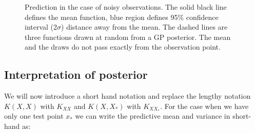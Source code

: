\begin{figure}[!ht]
  \centering
    \quad
{}\quad
  
       \caption{Prediction in the case of noisy observations. The solid black line defines the mean function, blue region defines 95\% confidence interval (2\(\sigma\)) distance away from the mean. The dashed lines are three functions drawn at random from a GP posterior. The mean and the draws do not pass exactly from the observation point.}
       \label{figGPNoisyPosteriors}
\end{figure}

\subsection{Interpretation of posterior}
We will now introduce a short hand notation and replace the lengthy notation \(K(X, X)\) with \(K_{XX}\) and \(K(X, X_{*})\) with \(K_{XX_{*}}\). For the case when we have only one test point \(x_{*}\) we can write the predictive mean and variance in short-hand as:

